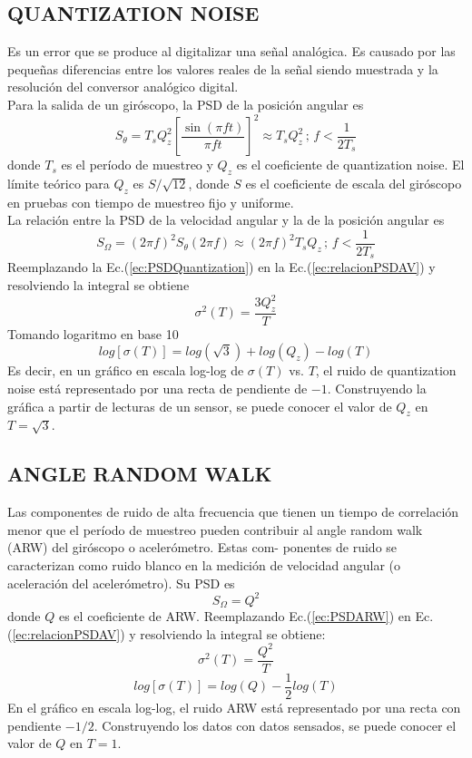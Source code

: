 \documentclass[a4paper,11pt,twoside]{IT-CNEA}
\begin{document}
\subsection{QUANTIZATION NOISE}
Es un error que se produce al digitalizar una señal analógica. Es causado por las pequeñas diferencias entre los valores reales de la señal siendo muestrada y la resolución del conversor analógico digital.
\\ Para la salida de un giróscopo, la PSD de la posición angular es
\begin{equation}
S_{\theta}=T_sQ_z^2\left[ \frac{\sin\left( \pi ft\right)}{\pi ft}\right]^2\approx T_sQ_z^2\,;\,f<\frac{1}{2T_s}
\end{equation}
donde $T_s$ es el período de muestreo y $Q_z$ es el coeficiente de quantization noise. El límite teórico para $Q_z$ es $S/\sqrt{12}$, donde $S$ es el coeficiente de escala del giróscopo en pruebas con tiempo de muestreo fijo y uniforme.
\\ La relación entre la PSD de la velocidad angular y la de la posición angular es 
\begin{equation}
S_{\Omega}=\left( 2\pi f\right)^2S_{\theta}\left( 2\pi f\right)\approx 	\left( 2\pi f\right)^2T_sQ_z\,;\,f<\frac{1}{2T_s}
\label{ec:PSDQuantization}
\end{equation}
Reemplazando la Ec.(\ref{ec:PSDQuantization}) en la Ec.(\ref{ec:relacionPSDAV}) y resolviendo la integral se obtiene
\begin{equation}
\sigma^2(T)=\frac{3Q_z^2}{T}
\end{equation}
Tomando logaritmo en base 10
\begin{equation}
log\left[ \sigma(T)\right]=log\left( \sqrt{3}\right)+log\left( Q_z\right)-log(T)
\end{equation}
Es decir, en un gráfico en escala log-log de $\sigma(T)$ vs. $T$, el ruido de quantization noise está representado por una recta de pendiente de $-1$. Construyendo la gráfica a partir de lecturas de un sensor, se puede conocer el valor de $Q_z$ en $T=\sqrt{3}$.	
\subsection{ANGLE RANDOM WALK}
Las componentes de ruido de alta frecuencia que tienen un tiempo de correlación menor que el
período de muestreo pueden contribuir al angle random walk (ARW) del giróscopo o acelerómetro. Estas com-
ponentes de ruido se caracterizan como ruido blanco en la medición de velocidad angular (o aceleración
del acelerómetro). Su PSD es
\begin{equation}
S_{\Omega}=Q^2
\label{ec:PSDARW}
\end{equation}
donde $Q$ es el coeficiente de ARW. Reemplazando Ec.(\ref{ec:PSDARW}) en Ec.(\ref{ec:relacionPSDAV}) y resolviendo la integral se obtiene:
\begin{equation}
\sigma^2(T)=\frac{Q^2}{T} 
\end{equation}
\begin{equation}
log\left[ \sigma(T)\right]=log(Q)-\frac{1}{2}log(T)
\end{equation}
En el gráfico en escala log-log, el ruido ARW está representado por una recta con pendiente $-1/2$. Construyendo los datos con datos sensados, se puede conocer el valor de $Q$ en $T=1$.
\end{document}
